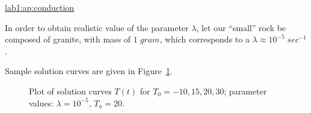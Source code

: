 \begin{example}
  \begin{mathnote} 
    \hyperref{Details of the derivation \dots}{See Appendix }{ for a
      derivation of the solution.}{lab1:ap:conduction}
  \end{mathnote}
  
  In order to obtain realistic value of the parameter $\lambda$,
  let our ``small'' rock be composed of granite, with mass of
  $1\;gram$, which corresponds to a   
  $\lambda \approx 10^{-5}\;sec^{-1}$.  

%
% 
\begin{latexonly}
    Sample solution curves are given in Figure~\ref{lab1:fig:conduction}.
    \begin{figure}[htbp]
      \begin{center}
        \leavevmode
        \caption{Plot of solution curves $T(t)$ for $T_0=-10,15,20,30$;
          parameter values: $\lambda=10^{-5}$, $T_a=20$.} 
        \label{lab1:fig:conduction}
      \end{center}
    \end{figure}
\end{latexonly}



\end{example}

